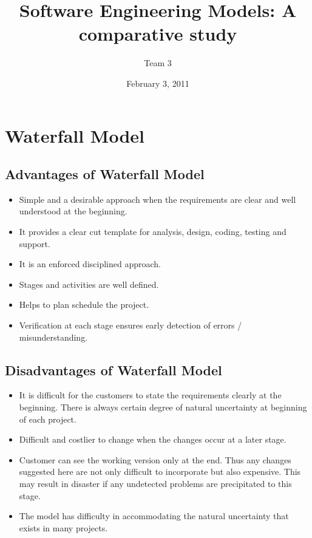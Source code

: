 \documentclass{article}
\begin{document}
\title{Software Engineering Models: A comparative study}

\author{Team 3}

\date{February 3, 2011}

\maketitle

\newpage{}
\tableofcontents
\newpage{}

\newpage{}

\section{Waterfall Model}
\subsection{Advantages of Waterfall Model}
\begin{itemize}
\item Simple and a desirable approach when the requirements are clear and well understood at the beginning.
\item    It provides a clear cut template for analysis, design, coding, testing and support.
\item        It is an enforced disciplined approach.
\item            Stages and activities are well defined.
\item                Helps to plan schedule the project.
\item                    Verification at each stage ensures early detection of errors / misunderstanding.
\end{itemize}
\subsection{Disadvantages of Waterfall Model}
\begin{itemize}
\item It is difficult for the customers to state the requirements clearly at the beginning. There is always certain degree of natural uncertainty at beginning of each project.
\item     Difficult and costlier to change when the changes occur at a later stage.
\item         Customer can see the working version only at the end. Thus any changes suggested here are not only difficult to incorporate but also expensive. This may result in disaster if any undetected problems are precipitated to this stage.
\item             The model has difficulty in accommodating the natural uncertainty that exists in many projects.
\end{itemize}
\end{document}
